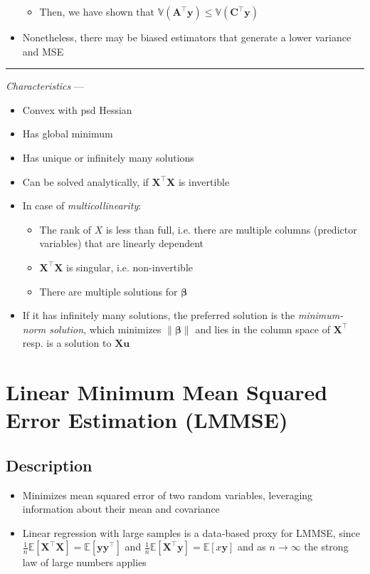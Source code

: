 \begin{itemize}
\begin{itemize}
        \item Then, we have shown that $\mathbb{V}(\boldsymbol{A}^\intercal \boldsymbol{y}) \leq \mathbb{V}(\boldsymbol{C}^\intercal \boldsymbol{y})$
    \end{itemize}
    \item Nonetheless, there may be biased estimators that generate a lower variance and MSE
\end{itemize}

{\color{lightgray}\hrule height 0.001mm}

\emph{Characteristics} --- 
\begin{itemize}
    \item Convex with psd Hessian
    \item Has global minimum
    \item Has unique or infinitely many solutions
    \item Can be solved analytically, if $\boldsymbol{X}^\intercal \boldsymbol{X}$ is invertible
    \item In case of \emph{multicollinearity}:
    \begin{itemize}
        \item The rank of $X$ is less than full, i.e. there are multiple columns (predictor variables) that are linearly dependent
        \item $\boldsymbol{X}^\intercal \boldsymbol{X}$ is singular, i.e. non-invertible
        \item There are multiple solutions for $\boldsymbol{\beta}$
    \end{itemize}
    \item If it has infinitely many solutions, the preferred solution is the \emph{minimum-norm solution}, which minimizes $\| \boldsymbol{\beta} \|$ and lies in the column space of $\boldsymbol{X}^\intercal$ resp. is a solution to $\boldsymbol{X}\boldsymbol{u}$
\end{itemize}

\section{Linear Minimum Mean Squared Error Estimation (LMMSE)}
\subsection*{Description}
\begin{itemize}
    \item Minimizes mean squared error of two random variables, leveraging information about their mean and covariance
    \item Linear regression with large samples is a data-based proxy for LMMSE, since $\frac{1}{n} \mathbb{E}[\boldsymbol{X}^\intercal\boldsymbol{X}] = \mathbb{E}[\boldsymbol{y}\boldsymbol{y}^\intercal]$ and $\frac{1}{n} \mathbb{E}[\boldsymbol{X}^\intercal\boldsymbol{y}] = \mathbb{E}[x\boldsymbol{y}]$ and as $n \to \infty$ the strong law of large numbers applies
\end{itemize}

